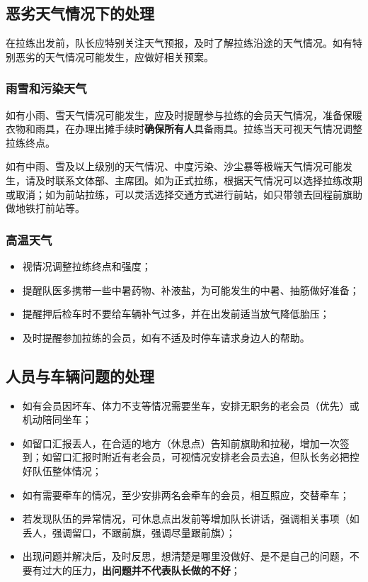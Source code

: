 \documentclass[UTF8]{ctexart}
\begin{document}
\subsection{恶劣天气情况下的处理}

在拉练出发前，队长应特别关注天气预报，及时了解拉练沿途的天气情况。如有特别恶劣的天气情况可能发生，应做好相关预案。

\subsubsection{雨雪和污染天气}

如有小雨、雪天气情况可能发生，应及时提醒参与拉练的会员天气情况，准备保暖衣物和雨具，在办理出摊手续时\textbf{确保所有人}具备雨具。拉练当天可视天气情况调整拉练终点。

如有中雨、雪及以上级别的天气情况、中度污染、沙尘暴等极端天气情况可能发生，请及时联系文体部、主席团。如为正式拉练，根据天气情况可以选择拉练改期或取消；如为前站拉练，可以灵活选择交通方式进行前站，如只带领去回程前旗助做地铁打前站等。

\subsubsection{高温天气}

\begin{itemize}[nosep,left=2em]
    \item 视情况调整拉练终点和强度；
    \item 提醒队医多携带一些中暑药物、补液盐，为可能发生的中暑、抽筋做好准备；
    \item 提醒押后检车时不要给车辆补气过多，并在出发前适当放气降低胎压；
    \item 及时提醒参加拉练的会员，如有不适及时停车请求身边人的帮助。
\end{itemize}

\subsection{人员与车辆问题的处理}
\begin{itemize}[nosep,left=2em]
    \item 如有会员因坏车、体力不支等情况需要坐车，安排无职务的老会员（优先）或机动陪同坐车；
    \item 如留口汇报丢人，在合适的地方（休息点）告知前旗助和拉秘，增加一次签到；如留口汇报时附近有老会员，可视情况安排老会员去追，但队长务必把控好队伍整体情况；
    \item 如有需要牵车的情况，至少安排两名会牵车的会员，相互照应，交替牵车；
    \item 若发现队伍的异常情况，可休息点出发前等增加队长讲话，强调相关事项（如丢人，强调留口，不跟前旗，强调尽量跟前旗）；
    \item 出现问题并解决后，及时反思，想清楚是哪里没做好、是不是自己的问题，不要有过大的压力，\textbf{出问题并不代表队长做的不好}；
\end{itemize}
\end{document}
